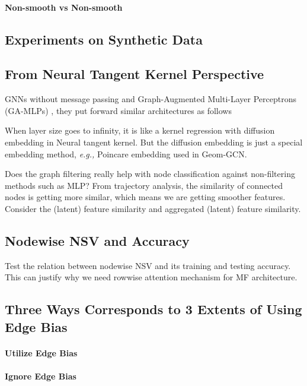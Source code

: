 \documentclass{article}
\newcommand\eg{\textit{e.g.,}}
\newcommand{\0}{{\boldsymbol{0}}}
\newcommand{\6}{{\partial}}
\newcommand{\8}{{\infty}}
\newcommand{\4}{{\nabla}}
\begin{document}
\paragraph{Non-smooth  vs Non-smooth }

\subsection{Experiments on Synthetic Data}



\fi
\iffalse
\subsection{From Neural Tangent Kernel Perspective}

GNNs without message passing \cite{hamilton2020graph} and Graph-Augmented Multi-Layer Perceptrons (GA-MLPs) \cite{chen2020graph}, they put forward similar architectures as follows


When layer size goes to infinity, it is like a kernel regression with diffusion embedding in Neural tangent kernel. But the diffusion embedding is just a special embedding method, \eg{} Poincare embedding used in Geom-GCN.

Does the graph filtering really help with node classification against non-filtering methods such as MLP? From trajectory analysis\cite{mengunderstanding}, the similarity of connected nodes is getting more similar, which means we are getting smoother features. Consider the (latent) feature similarity and aggregated (latent) feature similarity.
\subsection{Nodewise NSV and Accuracy}
Test the relation between nodewise NSV and its training and testing accuracy. This can justify why we need rowwise attention mechanism for MF architecture.

\subsection{Three Ways Corresponds to 3 Extents of Using Edge Bias}

\paragraph{Utilize Edge Bias}

\paragraph{Ignore Edge Bias}
\end{document}
